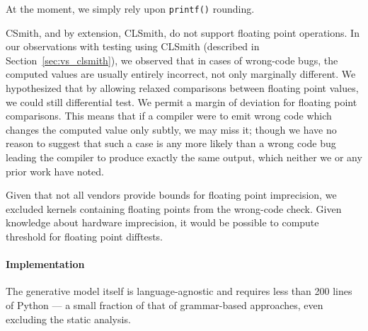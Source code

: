 At the moment, we simply rely upon \texttt{printf()} rounding.

CSmith, and by extension, CLSmith, do not support floating point operations. In our observations with testing using CLSmith (described in Section~\ref{sec:vs_clsmith}), we observed that in cases of wrong-code bugs, the computed values are usually entirely incorrect, not only marginally different. We hypothesized that by allowing relaxed comparisons between floating point values, we could still differential test. We permit a margin of deviation for floating point comparisons. This means that if a compiler were to emit wrong code which changes the computed value only subtly, we may miss it; though we have no reason to suggest that such a case is any more likely than a wrong code bug leading the compiler to produce exactly the same output, which neither we or any prior work have noted.

Given that not all vendors provide bounds for floating point imprecision, we excluded kernels containing floating points from the wrong-code check. Given knowledge about hardware imprecision, it would be possible to compute threshold for floating point difftests.

\paragraph{Implementation} The generative model itself is language-agnostic and requires less than 200 lines of Python --- a small fraction of that of grammar-based approaches, even excluding the static analysis.